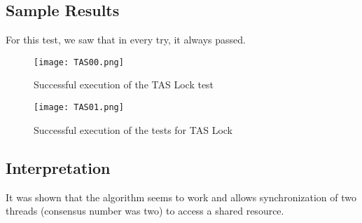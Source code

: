 \subsection{Sample Results}
\par
For this test, we saw that in every try, it always passed.
\par
\begin{figure}[h]
  \centering
  \texttt{[image: TAS00.png]}
  \caption{Successful execution of the TAS Lock test}
  \label{fig:TAS00}
\end{figure}
\par
\begin{figure}[h]
  \centering
  \texttt{[image: TAS01.png]}
  \caption{Successful execution of the tests  for TAS Lock}
  \label{fig:TAS01}
\end{figure}
\par
\subsection{Interpretation}
It was shown that the algorithm seems to work and allows synchronization of two
threads (consensus number was two) to access a shared resource.
